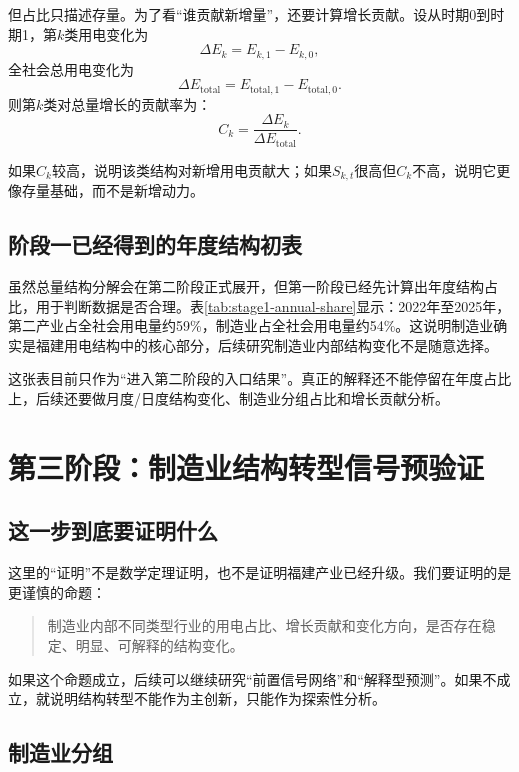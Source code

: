 \documentclass[UTF8,a4paper,11pt]{ctexart}
\begin{document}
但占比只描述存量。为了看“谁贡献新增量”，还要计算增长贡献。设从时期0到时期1，第$k$类用电变化为
\[
\Delta E_k=E_{k,1}-E_{k,0},
\]
全社会总用电变化为
\[
\Delta E_{\mathrm{total}}=E_{\mathrm{total},1}-E_{\mathrm{total},0}.
\]
则第$k$类对总量增长的贡献率为：
\[
C_k
=
\frac{\Delta E_k}{\Delta E_{\mathrm{total}}}.
\]

如果$C_k$较高，说明该类结构对新增用电贡献大；如果$S_{k,t}$很高但$C_k$不高，说明它更像存量基础，而不是新增动力。

\subsection{阶段一已经得到的年度结构初表}

虽然总量结构分解会在第二阶段正式展开，但第一阶段已经先计算出年度结构占比，用于判断数据是否合理。表\ref{tab:stage1-annual-share}显示：2022年至2025年，第二产业占全社会用电量约59\%，制造业占全社会用电量约54\%。这说明制造业确实是福建用电结构中的核心部分，后续研究制造业内部结构变化不是随意选择。

\begin{table}[htbp]
\centering
\caption{阶段一年度结构占比初表}
\label{tab:stage1-annual-share}
\resizebox{\linewidth}{!}{}
\end{table}

这张表目前只作为“进入第二阶段的入口结果”。真正的解释还不能停留在年度占比上，后续还要做月度/日度结构变化、制造业分组占比和增长贡献分析。

\section{第三阶段：制造业结构转型信号预验证}

\subsection{这一步到底要证明什么}

这里的“证明”不是数学定理证明，也不是证明福建产业已经升级。我们要证明的是更谨慎的命题：

\begin{quote}
制造业内部不同类型行业的用电占比、增长贡献和变化方向，是否存在稳定、明显、可解释的结构变化。
\end{quote}

如果这个命题成立，后续可以继续研究“前置信号网络”和“解释型预测”。如果不成立，就说明结构转型不能作为主创新，只能作为探索性分析。

\subsection{制造业分组}
\end{document}
